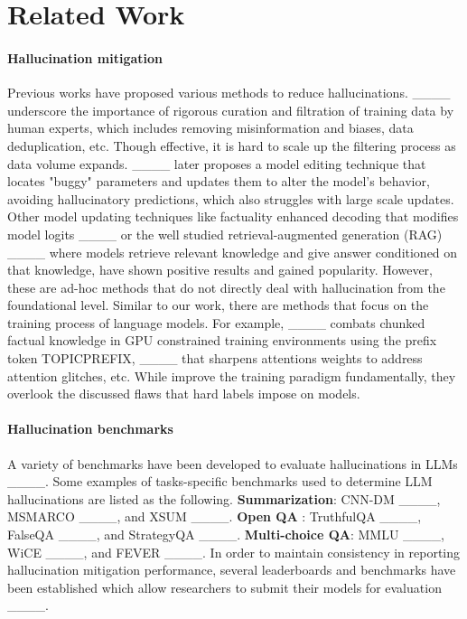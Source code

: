 \section{Related Work}
\paragraph{Hallucination mitigation}
Previous works have proposed various methods to reduce hallucinations. 
____ underscore the importance of rigorous curation and filtration of training data by human experts, which includes removing misinformation and biases, data deduplication, etc. Though effective, it is hard to scale up the filtering process as data volume expands. 
____ later proposes a model editing technique that locates "buggy" parameters and updates them to alter the model's behavior, avoiding hallucinatory predictions, which also struggles with large scale updates. 
Other model updating techniques like factuality enhanced decoding that modifies model logits ____ or the well studied retrieval-augmented generation (RAG) ____ where models retrieve relevant knowledge and give answer conditioned on that knowledge, have shown positive results and gained popularity. However, these are ad-hoc methods that do not directly deal with hallucination from the foundational level. 
Similar to our work, there are methods that focus on the training process of language models. 
For example, ____ combats chunked factual knowledge in GPU constrained training environments using the prefix token TOPICPREFIX, ____ that sharpens attentions weights to address attention glitches, etc. While improve the training paradigm fundamentally, they overlook the discussed flaws that hard labels impose on models.

\paragraph{Hallucination benchmarks}
A variety of benchmarks have been developed to evaluate hallucinations in LLMs ____. Some examples of tasks-specific benchmarks used to determine LLM hallucinations are listed as the following.
\textbf{Summarization}: CNN-DM ____, MSMARCO ____, and XSUM ____.
\textbf{Open QA} : TruthfulQA ____, FalseQA ____, and StrategyQA ____.
\textbf{Multi-choice QA}: MMLU ____, WiCE ____, and FEVER ____.
In order to maintain consistency in reporting hallucination mitigation performance, several leaderboards and benchmarks have been established which allow researchers to submit their models for evaluation ____.


